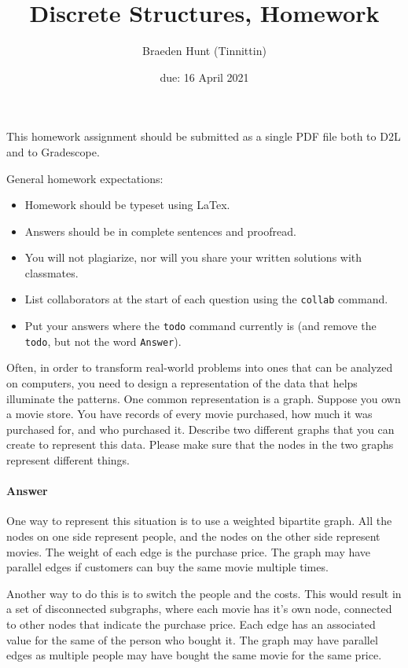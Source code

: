 \documentclass{article}
\title{Discrete Structures, Homework \hwnum}
\author{Braeden Hunt (Tinnittin)}
\date{due: 16 April 2021}
\begin{document}
\maketitle

This homework assignment should be
submitted as a single PDF file both to D2L and to Gradescope.

General homework expectations:
\begin{itemize}
    \item Homework should be typeset using LaTex.
    \item Answers should be in complete sentences and proofread.
    \item You will not plagiarize, nor will you share your written solutions
        with classmates.
    \item List collaborators at the start of each question using the \texttt{collab} command.
    \item Put your answers where the \texttt{todo} command currently is (and
        remove the \texttt{todo}, but not the word \texttt{Answer}).
\end{itemize}


 

Often, in order to transform real-world problems into ones that can be analyzed
on computers, you need to design a representation of the data that helps
illuminate the patterns.  One common representation is a graph.  Suppose you own
a movie store.  You have records of every movie purchased, how much it was
purchased for, and who purchased it.  Describe two different graphs that you can
create to represent this data.  Please make sure that the nodes in the two
graphs represent different things.

\paragraph{Answer}

One way to represent this situation is to use a weighted bipartite graph. All the nodes on one side represent people, and the nodes on the other side represent movies. The weight of each edge is the purchase price. The graph may have parallel edges if customers can buy the same movie multiple times.

Another way to do this is to switch the people and the costs. This would result in a set of disconnected subgraphs, where each movie has it's own node, connected to other nodes that indicate the purchase price. Each edge has an associated value for the same of the person who bought it. The graph may have parallel edges as multiple people may have bought the same movie for the same price. 
\end{document}
